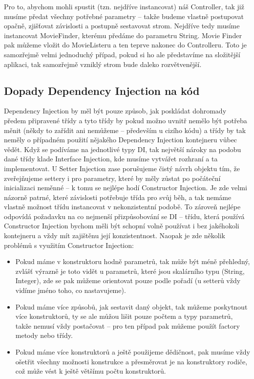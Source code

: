 \documentclass[a4paper,conference]{IEEEtran}
\begin{document}
Pro to, abychom mohli spustit (tzn. nejdříve instancovat) náš Controller, tak již musíme předat všechny potřebné parametry – takže budeme vlastně postupovat opačně, zjišťovat závislosti a postupně sestavovat strom. Nejdříve tedy musíme instancovat MovieFinder, kterému předáme do parametru String. Movie Finder pak můžeme vložit do MovieListeru a ten teprve nakonec do Controlleru. Toto je samozřejmě velmi jednoduchý případ, pokud si ho ale představíme na složitější aplikaci, tak samozřejmě vzniklý strom bude daleko rozvětvenější.

\subsection{Dopady Dependency Injection na kód}

Dependency Injection by měl být pouze způsob, jak poskládat dohromady předem připravené třídy a tyto třídy by pokud možno uvnitř nemělo být potřeba měnit (někdy to zařídit ani nemůžeme – především u cizího kódu) a třídy by tak neměly o případném použití nějakého Dependency Injection kontejneru vůbec vědět. Když se podíváme na jednotlivé typy DI, tak největší nároky na podobu dané třídy klade Interface Injection, kde musíme vytvářet rozhraní a ta implementovat. U Setter Injection zase porušujeme čistý návrh objektu tím, že zveřejňujeme settery i pro parametry, které by měly zůstat po počáteční inicializaci neměnné – k tomu se nejlépe hodí Constructor Injection. Je zde velmi názorně patrné, které závislosti potřebuje třída pro svůj běh, a tak nemáme vlastně možnost třídu instancovat v nekonzistentní podobě. To zároveň nejlépe odpovídá požadavku na co nejmenší přizpůsobování se DI – třídu, která používá Constructor Injection bychom měli být schopní volně používat i bez jakéhokoli kontejneru a vždy mít zajištěnu její konzistentnost.
Naopak je zde několik problémů s využitím Constructor Injection:
\begin{itemize}
\item Pokud máme v konstruktoru hodně parametrů, tak může být méně přehledný, zvlášť výrazně je toto vidět u parametrů, které jsou skalárního typu (String, Integer), zde se pak můžeme orientovat pouze podle pořadí (u setterů vždy vidíme jméno toho, co nastavujeme).
\item Pokud máme více způsobů, jak sestavit daný objekt, tak můžeme poskytnout více konstruktorů, ty se ale můžou lišit pouze počtem a typy parametrů, takže nemusí vždy postačovat – pro ten případ pak můžeme použít factory metody nebo třídy.
\item Pokud máme více konstruktorů a ještě použijeme dědičnost, pak musíme vždy ošetřit všechny možnosti konstrukce a přesměrovat je na konstruktory rodiče, což může vést k ještě většímu počtu konstruktorů.
\end{itemize}
\end{document}
